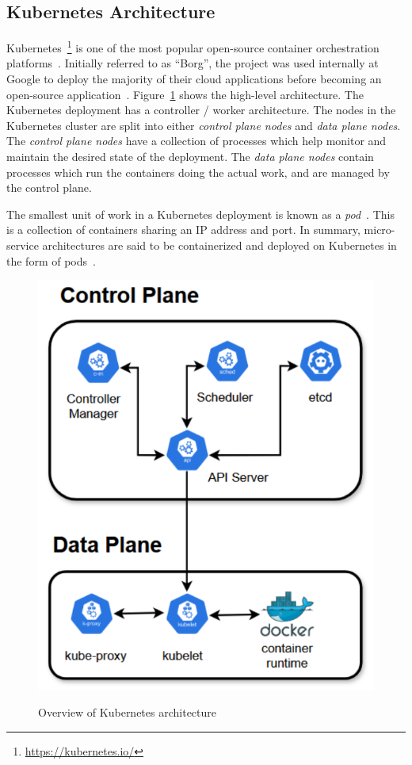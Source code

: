 \subsection{Kubernetes Architecture}
\label{subsec:ch2-k8s-overview}

Kubernetes~\footnote{\url{https://kubernetes.io/}} is one of the most popular open-source container orchestration platforms~\cite{vayghan2019kubernetes}. Initially referred to as ``Borg'', the project was used internally at Google to deploy the majority of their cloud applications before becoming an open-source application~\cite{burns2016borg}. Figure~\ref{fig:k8s-arch} shows the high-level architecture. The Kubernetes deployment has a controller / worker architecture. The nodes in the Kubernetes cluster are split into either \textit{control plane nodes} and \textit{data plane nodes}. The \textit{control plane nodes} have a collection of processes which help monitor and maintain the desired state of the deployment. The \textit{data plane nodes} contain processes which run the containers doing the actual work, and are managed by the control plane.\par
The smallest unit of work in a Kubernetes deployment is known as a \textit{pod}~\cite{baier2017getting}. This is a collection of containers sharing an IP address and port. In summary, micro-service architectures are said to be containerized and deployed on Kubernetes in the form of pods~\cite{vayghan2019kubernetes}.\par
\begin{figure}[htb]
    \centering
    \caption{Overview of Kubernetes architecture}
    \includegraphics[width=0.5\linewidth]{Figures/K8s-Architecture.pdf}
    \label{fig:k8s-arch}
\end{figure}

